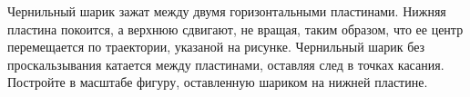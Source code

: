 Чернильный шарик зажат между двумя горизонтальными пластинами. Нижняя пластина покоится, а верхнюю сдвигают, не вращая, таким образом, что ее центр перемещается по траектории, указаной на рисунке. Чернильный шарик без проскальзывания катается между пластинами, оставляя след в точках касания. Постройте в масштабе фигуру, оставленную шариком на нижней пластине.